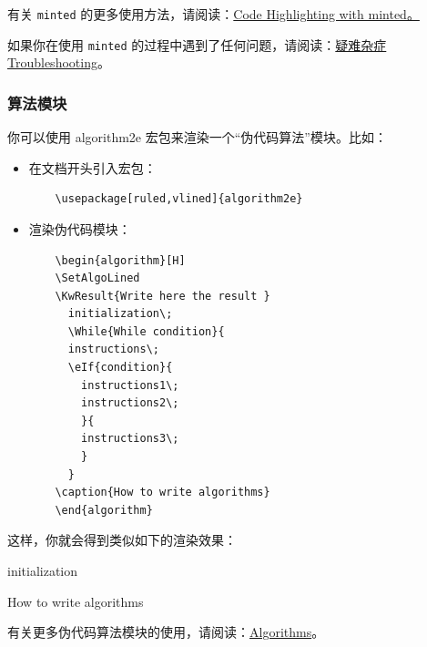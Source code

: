 有关 \texttt{minted} 的更多使用方法，请阅读：\href{https://www.overleaf.com/learn/latex/Code_Highlighting_with_minted}{Code Highlighting with minted。}

如果你在使用 \texttt{minted} 的过程中遇到了任何问题，请阅读：\href{https://github.com/spencerwooo/BIThesis/wiki/Troubleshooting}{疑难杂症 Troubleshooting}。

\subsubsection{算法模块}

你可以使用 algorithm2e 宏包来渲染一个“伪代码算法”模块。比如：

\begin{itemize}
  \item 在文档开头引入宏包：
  \begin{verbatim}
    \usepackage[ruled,vlined]{algorithm2e}
  \end{verbatim}
  \item 渲染伪代码模块：
  \begin{verbatim}
    \begin{algorithm}[H]
    \SetAlgoLined
    \KwResult{Write here the result }
      initialization\;
      \While{While condition}{
      instructions\;
      \eIf{condition}{
        instructions1\;
        instructions2\;
        }{
        instructions3\;
        }
      }
    \caption{How to write algorithms}
    \end{algorithm}
  \end{verbatim}
\end{itemize}

这样，你就会得到类似如下的渲染效果：

\begin{algorithm}[H]
  \SetAlgoLined
  initialization\;
  \caption{How to write algorithms}
\end{algorithm}

有关更多伪代码算法模块的使用，请阅读：\href{https://www.overleaf.com/learn/latex/algorithms}{Algorithms}。
